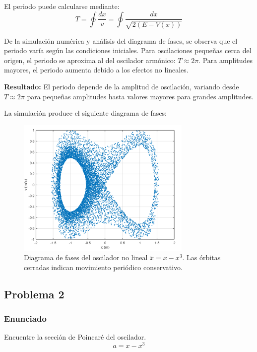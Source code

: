 \documentclass[a4paper,12pt]{article}
\theoremstyle{mytheor}
\begin{document}
El periodo puede calcularse mediante:
\begin{equation}
T = \oint \frac{dx}{v} = \oint \frac{dx}{\sqrt{2(E - V(x))}}
\end{equation}

De la simulación numérica y análisis del diagrama de fases, se observa que el periodo varía según las condiciones iniciales. Para oscilaciones pequeñas cerca del origen, el periodo se aproxima al del oscilador armónico: $T \approx 2\pi$. Para amplitudes mayores, el periodo aumenta debido a los efectos no lineales.

\textbf{Resultado:} El periodo depende de la amplitud de oscilación, variando desde $T \approx 2\pi$ para pequeñas amplitudes hasta valores mayores para grandes amplitudes.

La simulación produce el siguiente diagrama de fases:

\begin{figure}[H]
    \centering
    \includegraphics[width=0.75\textwidth]{g8.png}
    \caption{Diagrama de fases del oscilador no lineal $\ddot{x} = x - x^3$. Las órbitas cerradas indican movimiento periódico conservativo.}
    \label{fig:diagrama_fase_oscilador} 
\end{figure}


\subsection{Problema 2}
\subsubsection{Enunciado}
Encuentre la sección de Poincaré del oscilador.
\begin{equation}
a = x - x^3
\end{equation}
\end{document}
